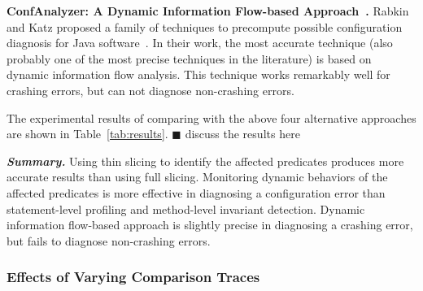 \vspace{1mm}
\noindent \textbf{ConfAnalyzer: A Dynamic Information Flow-based Approach~\cite{Rabkin:2011:PPC}.}
Rabkin and Katz proposed a family of techniques to precompute possible
configuration diagnosis for Java software~\cite{Rabkin:2011:PPC}. In their work,
the most accurate technique (also probably one of the most precise techniques in the literature)
is based on dynamic information flow analysis.
This technique works remarkably well for crashing errors, but can
not diagnose non-crashing errors.

\vspace{1mm}

The experimental results of comparing \ourtool with the above
four alternative approaches are shown in Table~\ref{tab:results}.
$\blacksquare$ discuss the results here

\vspace{1mm}
\noindent \textbf{\textit{Summary.}} Using thin slicing to identify
the affected predicates produces more accurate results than using
full slicing. Monitoring dynamic behaviors of the affected
predicates is more effective in diagnosing a configuration error
than statement-level profiling and method-level invariant detection.
Dynamic information flow-based approach is slightly precise in diagnosing
a crashing error, but fails to diagnose non-crashing errors.

\subsubsection{Effects of Varying Comparison Traces}
\label{sec:ranking}


